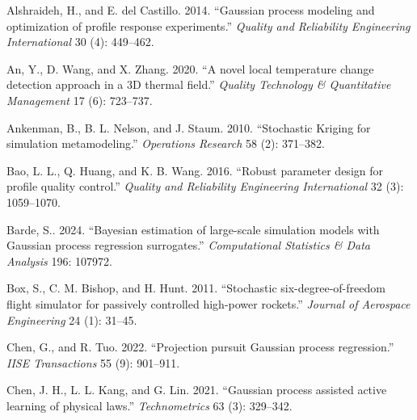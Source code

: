 \documentclass[]{interact}
\theoremstyle{plain}%
\theoremstyle{definition}
\theoremstyle{remark}
\begin{document}
\begin{thebibliography}{}


Alshraideh, H., and E. del Castillo. 2014. ``Gaussian process modeling and optimization of profile response experiments.'' \emph{Quality and Reliability Engineering International} 30 (4): 449--462.

An, Y., D. Wang, and X. Zhang. 2020. ``A novel local temperature change detection approach in a 3D thermal field.'' \emph{Quality Technology \& Quantitative Management} 17 (6): 723--737.

Ankenman, B., B. L. Nelson, and J. Staum. 2010. ``Stochastic Kriging for simulation metamodeling.'' \emph{Operations Research} 58 (2): 371--382.


Bao, L. L., Q. Huang, and K. B. Wang. 2016. ``Robust parameter design for profile quality control.'' \emph{Quality and Reliability Engineering International} 32 (3): 1059--1070.

Barde, S.. 2024. ``Bayesian estimation of large-scale simulation models with Gaussian process regression surrogates.'' \emph{Computational Statistics \& Data Analysis} 196: 107972.

Box, S., C. M. Bishop, and H. Hunt. 2011. ``Stochastic six-degree-of-freedom flight simulator for passively controlled high-power rockets.'' \emph{Journal of Aerospace Engineering} 24 (1): 31--45.

Chen, G., and R. Tuo. 2022. ``Projection pursuit Gaussian process regression.'' \emph{IISE Transactions} 55 (9): 901--911.

Chen, J. H., L. L. Kang, and G. Lin. 2021. ``Gaussian process assisted active learning of physical laws.'' \emph{Technometrics} 63 (3): 329--342.


\end{thebibliography}
\end{document}
